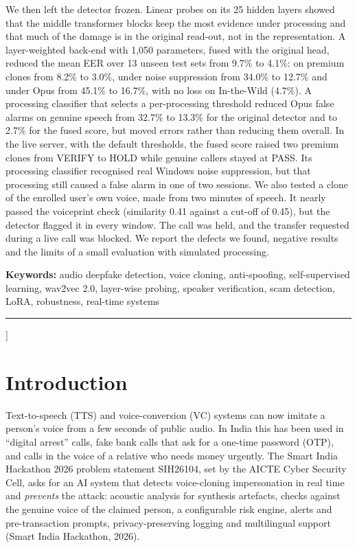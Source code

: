 \documentclass[10pt,a4paper,twocolumn]{article}
\begin{document}
\begin{minipage}{\textwidth}
We then left the detector frozen. Linear probes on its 25 hidden layers showed that the middle transformer blocks keep the most evidence under processing and that much of the damage is in the original read-out, not in the representation. A layer-weighted back-end with 1,050 parameters, fused with the original head, reduced the mean EER over 13 unseen test sets from 9.7\% to 4.1\%: on premium clones from 8.2\% to 3.0\%, under noise suppression from 34.0\% to 12.7\% and under Opus from 45.1\% to 16.7\%, with no loss on In-the-Wild (4.7\%). A processing classifier that selects a per-processing threshold reduced Opus false alarms on genuine speech from 32.7\% to 13.3\% for the original detector and to 2.7\% for the fused score, but moved errors rather than reducing them overall. In the live server, with the default thresholds, the fused score raised two premium clones from VERIFY to HOLD while genuine callers stayed at PASS. Its processing classifier recognised real Windows noise suppression, but that processing still caused a false alarm in one of two sessions. We also tested a clone of the enrolled user's own voice, made from two minutes of speech. It nearly passed the voiceprint check (similarity 0.41 against a cut-off of 0.45), but the detector flagged it in every window. The call was held, and the transfer requested during a live call was blocked.
We report the defects we found, negative results and the limits of a small evaluation with simulated processing.

\medskip
\noindent\textbf{Keywords:} audio deepfake detection, voice cloning, anti-spoofing, self-supervised learning, wav2vec 2.0, layer-wise probing, speaker verification, scam detection, LoRA, robustness, real-time systems
\end{minipage}
\vspace{4pt}

\noindent\rule{\textwidth}{0.4pt}
\vspace{8pt}
]

\section{Introduction}
Text-to-speech (TTS) and voice-conversion (VC) systems can now imitate a person's voice from a few seconds of public audio. In India this has been used in ``digital arrest'' calls, fake bank calls that ask for a one-time password (OTP), and calls in the voice of a relative who needs money urgently. The Smart India Hackathon 2026 problem statement SIH26104, set by the AICTE Cyber Security Cell, asks for an AI system that detects voice-cloning impersonation in real time and \emph{prevents} the attack: acoustic analysis for synthesis artefacts, checks against the genuine voice of the claimed person, a configurable risk engine, alerts and pre-transaction prompts, privacy-preserving logging and multilingual support (Smart India Hackathon, 2026).
\end{document}
